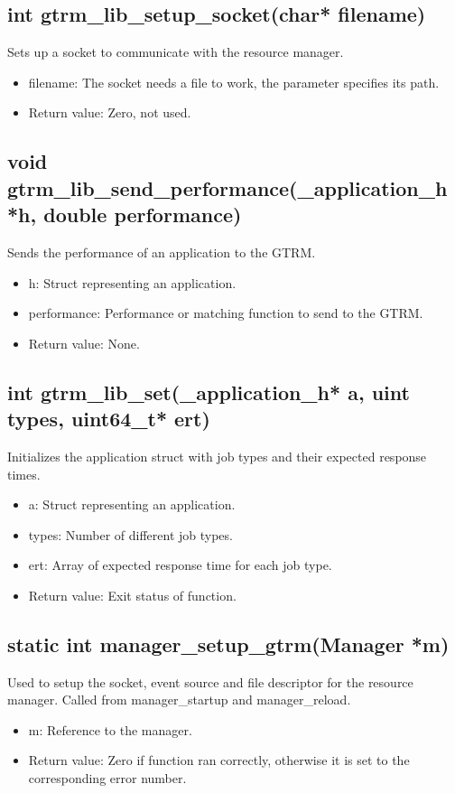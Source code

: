 \documentclass[nobiblatex]{LTHthesis}
\begin{document}
\subsection{int gtrm\_lib\_setup\_socket(char* filename)}
Sets up a socket to communicate with the resource manager.
\begin{itemize}
\item filename: The socket needs a file to work, the parameter specifies its path.
\item Return value: Zero, not used.
\end{itemize}

\subsection{void gtrm\_lib\_send\_performance(\_application\_h *h, double performance)}
Sends the performance of an application to the GTRM.
\begin{itemize}
\item h: Struct representing an application.
\item performance: Performance or matching function to send to the GTRM.
\item Return value: None.
\end{itemize}

\subsection{int gtrm\_lib\_set(\_application\_h* a, uint types, uint64\_t* ert)}
Initializes the application struct with job types and their expected response times.
\begin{itemize}
\item a: Struct representing an application.
\item types: Number of different job types.
\item ert: Array of expected response time for each job type.
\item Return value: Exit status of function.
\end{itemize}

\subsection{static int manager\_setup\_gtrm(Manager *m)}
Used to setup the socket, event source and file descriptor for the resource manager. Called from manager\_startup and manager\_reload.
\begin{itemize}
\item m: Reference to the manager.
\item Return value: Zero if function ran correctly, otherwise it is set to the corresponding error number.
\end{itemize}
\end{document}

